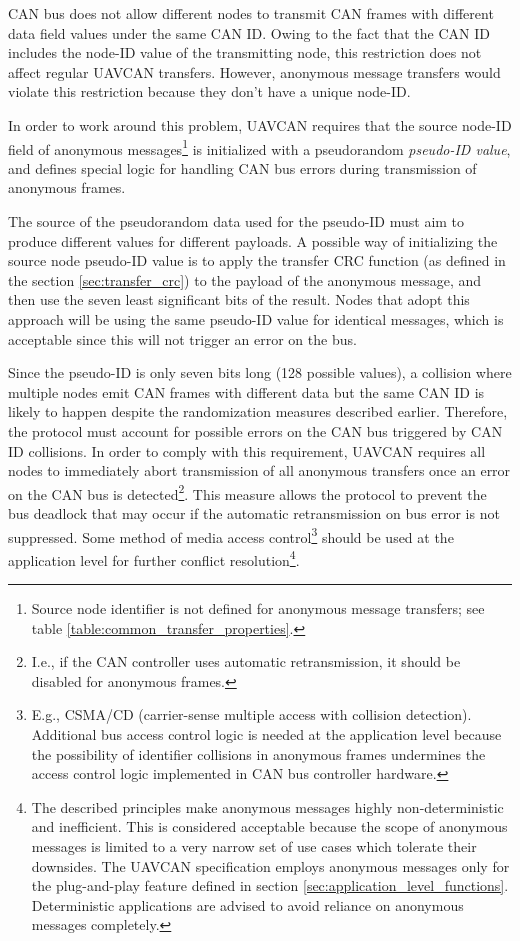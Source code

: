CAN bus does not allow different nodes to transmit CAN frames with different data field values under the same CAN ID.
Owing to the fact that the CAN ID includes the node-ID value of the transmitting node,
this restriction does not affect regular UAVCAN transfers.
However, anonymous message transfers would violate this restriction because they don't have a unique node-ID.

In order to work around this problem,
UAVCAN requires that the source node-ID field of anonymous messages\footnote{Source node identifier
is not defined for anonymous message transfers; see table \ref{table:common_transfer_properties}.}
is initialized with a pseudorandom \emph{pseudo-ID value},
and defines special logic for handling CAN bus errors during transmission of anonymous frames.

The source of the pseudorandom data used for the pseudo-ID must aim to produce different values for different payloads.
A possible way of initializing the source node pseudo-ID value is to apply the transfer CRC function
(as defined in the section \ref{sec:transfer_crc})
to the payload of the anonymous message, and then use the seven least significant bits of the result.
Nodes that adopt this approach will be using the same pseudo-ID value for identical messages,
which is acceptable since this will not trigger an error on the bus.

Since the pseudo-ID is only seven bits long (128 possible values),
a collision where multiple nodes emit CAN frames with different data but the same CAN ID is likely to happen
despite the randomization measures described earlier.
Therefore, the protocol must account for possible errors on the CAN bus triggered by CAN ID collisions.
In order to comply with this requirement,
UAVCAN requires all nodes to immediately abort transmission of all anonymous transfers once an error on
the CAN bus is detected\footnote{I.e., if the CAN controller uses automatic retransmission,
it should be disabled for anonymous frames.}.
This measure allows the protocol to prevent the bus deadlock that may occur if the automatic
retransmission on bus error is not suppressed.
Some method of media access control\footnote{%
    E.g., CSMA/CD (carrier-sense multiple access with collision detection).
    Additional bus access control logic is needed at the application level because
    the possibility of identifier collisions in anonymous frames undermines the access control logic implemented
    in CAN bus controller hardware.
}
should be used at the application level for further conflict resolution\footnote{%
    The described principles make anonymous messages highly non-deterministic and inefficient.
    This is considered acceptable because the scope of anonymous messages is limited to a very narrow set of use
    cases which tolerate their downsides. The UAVCAN specification employs anonymous messages only for the
    plug-and-play feature defined in section \ref{sec:application_level_functions}.
    Deterministic applications are advised to avoid reliance on anonymous messages completely.
}.

